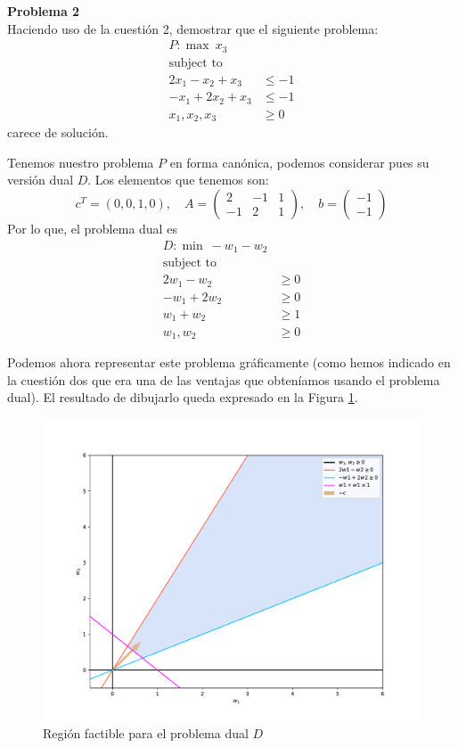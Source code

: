 \documentclass[a4paper]{article}
\newenvironment{problem}[2][Problema]
    { \begin{mdframed}[backgroundcolor=gray!20] \textbf{#1 #2} \\}
    {  \end{mdframed}}
\begin{document}
\begin{problem}{2}
Haciendo uso de la cuestión 2, demostrar que el siguiente problema:
\begin{align*}
 P: \max\ x_3 &\\
 \text{subject to}\\
 2x_1 - x_2 + x_3 & \leq -1\\
 -x_1 + 2x_2 + x_3 & \leq -1\\
 x_1,x_2,x_3 & \geq 0
\end{align*}
carece de solución.
\end{problem}

Tenemos nuestro problema \(P\) en forma canónica, podemos considerar pues su versión dual \(D\).  Los elementos que tenemos son:
\[
c^{T} = (0,0,1,0), \quad A = \begin{pmatrix} 2 & -1 & 1 \\ -1 & 2 & 1 \end{pmatrix},\quad b = \begin{pmatrix} -1 \\ -1\end{pmatrix}
\]
Por lo que, el problema dual es
\begin{align*}
  D: \min \ -w_{1} - w_{2}& \\
  \text{subject to}\\
  2w_{1} - w_{2} & \geq 0\\
  -w_{1} + 2w_{2}& \geq 0\\
  w_{1} + w_{2} & \geq 1\\
  w_{1},w_{2} & \geq 0
\end{align*}

Podemos ahora representar este problema gráficamente (como hemos indicado en la cuestión dos que era una de las ventajas que obteníamos usando el problema dual). El resultado de dibujarlo queda expresado en la Figura \ref{fig:dual}.

\begin{figure}[H]
  \centering
  \includegraphics[scale=0.4]{Ej4}
  \caption{Región factible para el problema dual \(D\)}
  \label{fig:dual}
\end{figure}
\end{document}
